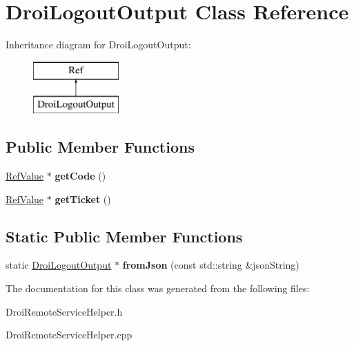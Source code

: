 \hypertarget{class_droi_logout_output}{}\section{Droi\+Logout\+Output Class Reference}
\label{class_droi_logout_output}
Inheritance diagram for Droi\+Logout\+Output\+:\begin{figure}[H]
\begin{center}
\leavevmode
\includegraphics[height=2.000000cm]{d7/dfa/class_droi_logout_output}
\end{center}
\end{figure}
\subsection*{Public Member Functions}
\begin{DoxyCompactItemize}
\item 
\mbox{\label{class_droi_logout_output_a1a8e288869d80d1965a166c97f97147c}} 
\hyperlink{class_ref_value}{Ref\+Value} $\ast$ {\bfseries get\+Code} ()
\item 
\mbox{\label{class_droi_logout_output_aedc9d93ddd7129989ced643cecf43f94}} 
\hyperlink{class_ref_value}{Ref\+Value} $\ast$ {\bfseries get\+Ticket} ()
\end{DoxyCompactItemize}
\subsection*{Static Public Member Functions}
\begin{DoxyCompactItemize}
\item 
\mbox{\label{class_droi_logout_output_ad2ba2af80dadbf4a9aadd2a9e5a911a8}} 
static \hyperlink{class_droi_logout_output}{Droi\+Logout\+Output} $\ast$ {\bfseries from\+Json} (const std\+::string \&json\+String)
\end{DoxyCompactItemize}


The documentation for this class was generated from the following files\+:\begin{DoxyCompactItemize}
\item 
Droi\+Remote\+Service\+Helper.\+h\item 
Droi\+Remote\+Service\+Helper.\+cpp\end{DoxyCompactItemize}
